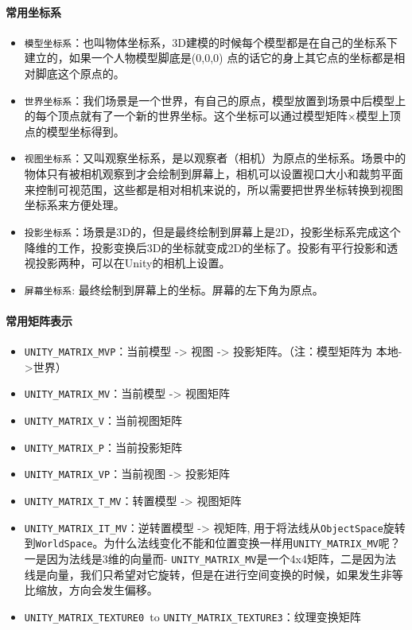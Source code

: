 \documentclass[UTF8,a4paper,12pt]{ctexbook}
\begin{document}
		\paragraph{常用坐标系}
			\begin{itemize}
				\item \verb|模型坐标系|：也叫物体坐标系，3D建模的时候每个模型都是在自己的坐标系下建立的，如果一个人物模型脚底是(0,0,0) 点的话它的身上其它点的坐标都是相对脚底这个原点的。 
				\item \verb|世界坐标系|：我们场景是一个世界，有自己的原点，模型放置到场景中后模型上的每个顶点就有了一个新的世界坐标。这个坐标可以通过模型矩阵×模型上顶点的模型坐标得到。 
				\item \verb|视图坐标系|：又叫观察坐标系，是以观察者（相机）为原点的坐标系。场景中的物体只有被相机观察到才会绘制到屏幕上，相机可以设置视口大小和裁剪平面来控制可视范围，这些都是相对相机来说的，所以需要把世界坐标转换到视图坐标系来方便处理。 
				\item \verb|投影坐标系|：场景是3D的，但是最终绘制到屏幕上是2D，投影坐标系完成这个降维的工作，投影变换后3D的坐标就变成2D的坐标了。投影有平行投影和透视投影两种，可以在Unity的相机上设置。 
				\item \verb|屏幕坐标系|: 最终绘制到屏幕上的坐标。屏幕的左下角为原点。
			\end{itemize}

		\paragraph{常用矩阵表示}
			\begin{itemize}
				\item \verb|UNITY_MATRIX_MVP|：当前模型 -> 视图 -> 投影矩阵。（注：模型矩阵为 本地->世界）
				\item \verb|UNITY_MATRIX_MV|：当前模型 -> 视图矩阵
				\item \verb|UNITY_MATRIX_V|：当前视图矩阵
				\item \verb|UNITY_MATRIX_P|：当前投影矩阵
				\item \verb|UNITY_MATRIX_VP|：当前视图 -> 投影矩阵
				\item \verb|UNITY_MATRIX_T_MV|：转置模型 -> 视图矩阵
				\item \verb|UNITY_MATRIX_IT_MV|：逆转置模型 -> 视矩阵, 用于将法线从\verb|ObjectSpace|旋转到\verb|WorldSpace|。为什么法线变化不能和位置变换一样用\verb|UNITY_MATRIX_MV|呢？一是因为法线是3维的向量而- \verb|UNITY_MATRIX_MV|是一个4x4矩阵，二是因为法线是向量，我们只希望对它旋转，但是在进行空间变换的时候，如果发生非等比缩放，方向会发生偏移。
				\item \verb|UNITY_MATRIX_TEXTURE0 |to \verb|UNITY_MATRIX_TEXTURE3|：纹理变换矩阵
			\end{itemize}
			
\end{document}
